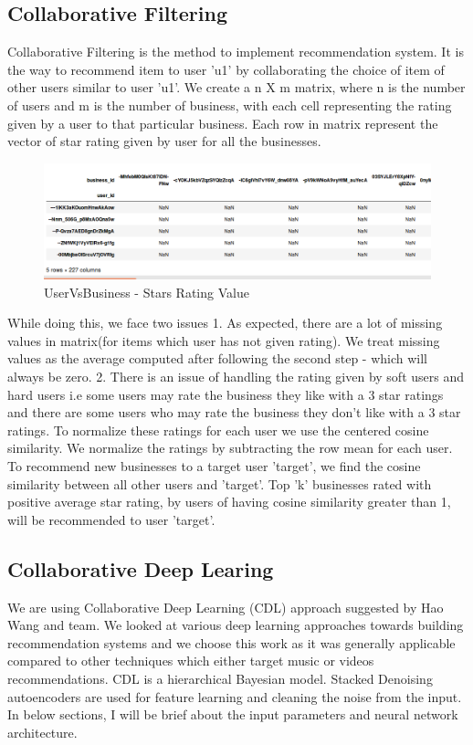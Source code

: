 \documentclass[11pt]{article}
\begin{document}
		\subsection{Collaborative Filtering}
		Collaborative Filtering is the method to implement recommendation system. It is the way to recommend item to user 'u1' by collaborating the choice of item of other users similar to user 'u1'. We create a n X m matrix, where n is the number of users and m is the number of business, with each cell representing the rating given by a user to that particular business. Each row in matrix represent the vector of star rating given by user for all the businesses. \\
	 
	 		\begin{figure}[h]
					\centering
					\includegraphics[scale=0.5]{uservsitem.png}
					\caption{UserVsBusiness - Stars Rating Value}
			\end{figure}
	 
		While doing this, we face two issues 
		1. As expected, there are a lot of missing values in matrix(for items which user has not given rating). We treat missing values as the average computed after following the second step - which will always be zero.
		2. There is an issue of handling the rating given by soft users and hard users i.e some users may rate the business they like with a 3 star ratings and there are some users who may rate the business they don't like with a 3 star ratings. To normalize these ratings for each user we use the centered cosine similarity. We normalize the ratings by subtracting the row mean for each user.\cite{vid1}\\
		
		To recommend new businesses to a target user 'target', we find the cosine similarity between all other users and 'target'. Top 'k' businesses rated with positive average star rating, by users of having cosine similarity greater than 1, will be recommended to user 'target'.\cite{vid2}
	
		\subsection{Collaborative Deep Learing} 
		We are using Collaborative Deep Learning \cite{cdl} (CDL) approach suggested by Hao Wang and team. We looked at various deep learning approaches towards building recommendation systems and we choose this work as it was generally applicable compared to other techniques which either target music or videos recommendations. CDL is a hierarchical Bayesian model. Stacked Denoising autoencoders \cite{sdae} are used for feature learning and cleaning the noise from the input. In below sections, I will be brief about the input parameters and neural network architecture.
		
\end{document}
